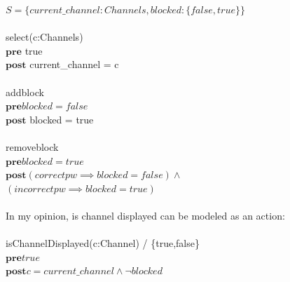 \documentclass{article}
\begin{document}
\begin{enumerate}
$S = \{ current\_channel: Channels, blocked: \{false,true\} \}  $ \\
\\
select(c:Channels) \\
$\textbf{pre}$ true \\
$\textbf{post}$ current\_channel = c \\
\\
addblock \\
$\textbf{pre} blocked = false $  \\
$\textbf{post}$ blocked = true \\
\\
removeblock \\
$\textbf{pre} blocked = true$ \\
$\textbf{post} (correctpw \implies blocked = false) \land  $   \\
$(incorrectpw \implies blocked = true ) $ \\
\\
In my opinion, is channel displayed can be modeled as an action: \\
\\
isChannelDisplayed(c:Channel) / \{true,false\} \\
$\textbf{pre} true$ \\
$\textbf{post} c = current\_channel \land \neg blocked$ \\
\\
\end{enumerate}
\end{document}
